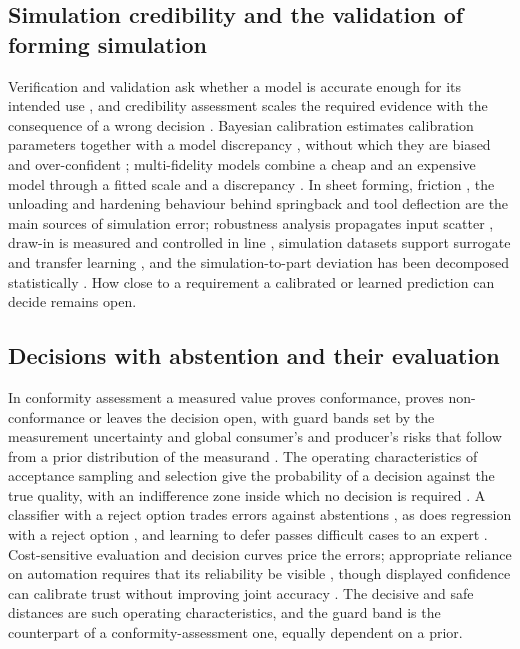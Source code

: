 \documentclass[pdflatex,sn-basic,lineno]{sn-jnl}
\begin{document}
\subsection{Simulation credibility and the validation of forming simulation}

Verification and validation ask whether a model is accurate enough for its intended use \citep{oberkampf2010verification}, and credibility assessment scales the required evidence with the consequence of a wrong decision \citep{asme2018assessing}. Bayesian calibration estimates calibration parameters together with a model discrepancy \citep{kennedy2001bayesian, higdon2004combining}, without which they are biased and over-confident \citep{brynjarsdottir2014learning, arendt2012quantification}; multi-fidelity models combine a cheap and an expensive model through a fitted scale and a discrepancy \citep{kennedy2000predicting, legratiet2014recursive}. In sheet forming, friction \citep{hol2012advanced}, the unloading and hardening behaviour behind springback \citep{yoshida2002model, wagoner2013advanced} and tool deflection \citep{pilthammar2018introduction} are the main sources of simulation error; robustness analysis propagates input scatter \citep{wiebenga2014effect, chen2022robustness}, draw-in is measured and controlled in line \citep{havinga2020exploiting, fischer2018implementation}, simulation datasets support surrogate and transfer learning \citep{baum2025ddacs, heinzelmann2025comprehensive}, and the simulation-to-part deviation has been decomposed statistically \citep{baum2026statistical}. How close to a requirement a calibrated or learned prediction can decide remains open.

\subsection{Decisions with abstention and their evaluation}

In conformity assessment a measured value proves conformance, proves non-conformance or leaves the decision open, with guard bands set by the measurement uncertainty \citep{iso2017decision} and global consumer's and producer's risks that follow from a prior distribution of the measurand \citep{jcgm2012evaluation}. The operating characteristics of acceptance sampling and selection give the probability of a decision against the true quality, with an indifference zone inside which no decision is required \citep{bechhofer1954single}. A classifier with a reject option trades errors against abstentions \citep{chow1970optimum, geifman2017selective}, as does regression with a reject option \citep{zaoui2020regression}, and learning to defer passes difficult cases to an expert \citep{madras2018predict}. Cost-sensitive evaluation \citep{elkan2001foundations} and decision curves \citep{vickers2006decision} price the errors; appropriate reliance on automation requires that its reliability be visible \citep{lee2004trust}, though displayed confidence can calibrate trust without improving joint accuracy \citep{zhang2020effect, zhang2021cautionary}. The decisive and safe distances are such operating characteristics, and the guard band is the counterpart of a conformity-assessment one, equally dependent on a prior.
\end{document}
